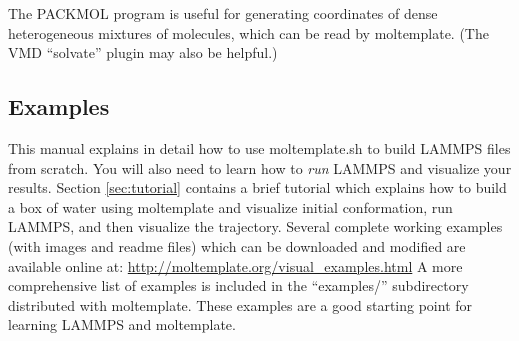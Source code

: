 \documentclass[11pt]{article}
\begin{document}
The PACKMOL \cite{packmol} program is useful for generating 
coordinates of dense heterogeneous mixtures of molecules,
which can be read by moltemplate.
(The VMD ``solvate'' plugin may also be helpful.)

\subsection*{Examples}




This manual explains in detail how to use moltemplate.sh to build LAMMPS 
files from scratch.  
You will also need to learn how to \textit{run} 
LAMMPS and visualize your results.
Section \ref{sec:tutorial} contains a brief tutorial
which explains how to build a box of water using moltemplate and 
visualize initial conformation, run LAMMPS, and then visualize the trajectory. 
Several complete working examples (with images and readme files)
which can be downloaded and modified are available online at:
\url{http://moltemplate.org/visual_examples.html}
A more comprehensive list of examples is included in
the ``examples/'' subdirectory distributed with moltemplate.  
These examples are a good starting point for learning LAMMPS and moltemplate.
\end{document}
